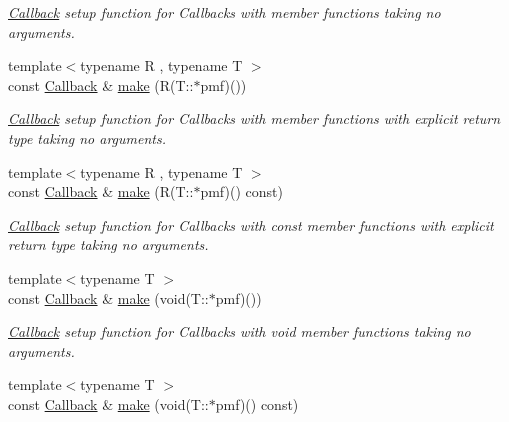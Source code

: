 \begin{DoxyCompactItemize}
\begin{DoxyCompactList}\small\item\em \hyperlink{class_d_d4hep_1_1_callback}{Callback} setup function for Callbacks with member functions taking no arguments. \item\end{DoxyCompactList}\item 
{\footnotesize template$<$typename R , typename T $>$ }\\const \hyperlink{class_d_d4hep_1_1_callback}{Callback} \& \hyperlink{class_d_d4hep_1_1_callback_a3d90b335e05a60b5e27e53dadc68c40b}{make} (R(T::$\ast$pmf)())
\begin{DoxyCompactList}\small\item\em \hyperlink{class_d_d4hep_1_1_callback}{Callback} setup function for Callbacks with member functions with explicit return type taking no arguments. \item\end{DoxyCompactList}\item 
{\footnotesize template$<$typename R , typename T $>$ }\\const \hyperlink{class_d_d4hep_1_1_callback}{Callback} \& \hyperlink{class_d_d4hep_1_1_callback_a707ddd54e7fed776ae0db179178a5e65}{make} (R(T::$\ast$pmf)() const)
\begin{DoxyCompactList}\small\item\em \hyperlink{class_d_d4hep_1_1_callback}{Callback} setup function for Callbacks with const member functions with explicit return type taking no arguments. \item\end{DoxyCompactList}\item 
{\footnotesize template$<$typename T $>$ }\\const \hyperlink{class_d_d4hep_1_1_callback}{Callback} \& \hyperlink{class_d_d4hep_1_1_callback_a87a6d5252f2275f57c7803f9f493e20e}{make} (void(T::$\ast$pmf)())
\begin{DoxyCompactList}\small\item\em \hyperlink{class_d_d4hep_1_1_callback}{Callback} setup function for Callbacks with void member functions taking no arguments. \item\end{DoxyCompactList}\item 
{\footnotesize template$<$typename T $>$ }\\const \hyperlink{class_d_d4hep_1_1_callback}{Callback} \& \hyperlink{class_d_d4hep_1_1_callback_aea1f37de334b82531ae96e582c957c6c}{make} (void(T::$\ast$pmf)() const)

\end{DoxyCompactItemize}
